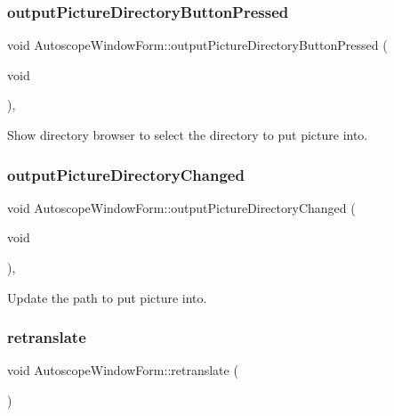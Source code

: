 \subsubsection{\texorpdfstring{outputPictureDirectoryButtonPressed}{outputPictureDirectoryButtonPressed}}
{\footnotesize\ttfamily void Autoscope\+Window\+Form\+::output\+Picture\+Directory\+Button\+Pressed (\begin{DoxyParamCaption}\item[{void}]{ }\end{DoxyParamCaption})\hspace{0.3cm}{\ttfamily [private]}, {\ttfamily [slot]}}



Show directory browser to select the directory to put picture into. 

\mbox{\label{class_autoscope_window_form_ac44f36cc4ccc68c6109d1c18ab7ba107}} 
\subsubsection{\texorpdfstring{outputPictureDirectoryChanged}{outputPictureDirectoryChanged}}
{\footnotesize\ttfamily void Autoscope\+Window\+Form\+::output\+Picture\+Directory\+Changed (\begin{DoxyParamCaption}\item[{void}]{ }\end{DoxyParamCaption})\hspace{0.3cm}{\ttfamily [private]}, {\ttfamily [slot]}}



Update the path to put picture into. 

\mbox{\label{class_autoscope_window_form_a3f3d731c45d104fee58dd4c2dcc6fd86}} 
\subsubsection{\texorpdfstring{retranslate}{retranslate}}
{\footnotesize\ttfamily void Autoscope\+Window\+Form\+::retranslate (\begin{DoxyParamCaption}{ }\end{DoxyParamCaption})\hspace{0.3cm}{\ttfamily [slot]}}



